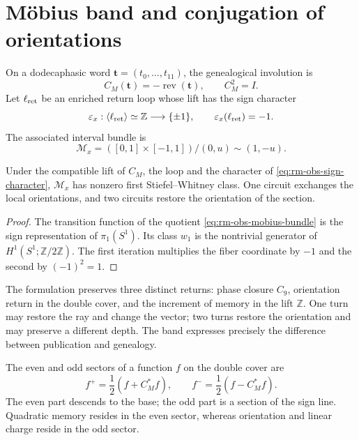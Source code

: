 \section{Möbius band and conjugation of orientations}

On a dodecaphasic word
\(\mathbf t=(t_0,\ldots,t_{11})\), the genealogical involution is
\begin{equation}
 C_M(\mathbf t)=-\operatorname{rev}(\mathbf t),
 \qquad
 C_M^2=I.
 \label{eq:rm-obs-word-involution}
\end{equation}
Let \(\ell_{\rm ret}\) be an enriched return loop whose lift
has the sign character
\begin{equation}
 \varepsilon_x:\langle\ell_{\rm ret}\rangle\simeq\mathbb Z
 \longrightarrow\{\pm1\},
 \qquad
 \varepsilon_x(\ell_{\rm ret})=-1.
 \label{eq:rm-obs-sign-character}
\end{equation}
The associated interval bundle is
\begin{equation}
 \mathcal M_x
 =([0,1]\times[-1,1])/(0,u)\sim(1,-u).
 \label{eq:rm-obs-mobius-bundle}
\end{equation}

\begin{theorem}
\label{thm:rm-obs-mobius-return}
Under the compatible lift of \(C_M\), the loop and the character of
\cref{eq:rm-obs-sign-character}, \(\mathcal M_x\) has nonzero first
Stiefel--Whitney class. One circuit exchanges the local orientations, and
two circuits restore the orientation of the section.
\end{theorem}

\begin{proof}
The transition function of the quotient
\cref{eq:rm-obs-mobius-bundle} is the sign representation of
\(\pi_1(S^1)\). Its class \(w_1\) is the nontrivial generator of
\(H^1(S^1;\mathbb Z/2\mathbb Z)\). The first iteration multiplies the
fiber coordinate by \(-1\) and the second by \((-1)^2=1\).
\end{proof}

The formulation preserves three distinct returns: phase closure
\(C_9\), orientation return in the double cover, and the increment of
memory in the lift \(\mathbb Z\). One turn may restore the
ray and change the vector; two turns restore the orientation and may
preserve a different depth. The band expresses precisely the
difference between publication and genealogy.

The even and odd sectors of a function \(f\) on the double cover are
\begin{equation}
 f^+=\frac12(f+C_M^*f),
 \qquad
 f^-=\frac12(f-C_M^*f).
 \label{eq:rm-obs-even-odd-decomposition}
\end{equation}
The even part descends to the base; the odd part is a section of the
sign line. Quadratic memory resides in the even sector, whereas
orientation and linear charge reside in the odd sector.


